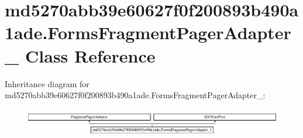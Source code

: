\hypertarget{classmd5270abb39e60627f0f200893b490a1ade_1_1FormsFragmentPagerAdapter__1}{}\section{md5270abb39e60627f0f200893b490a1ade.\+Forms\+Fragment\+Pager\+Adapter\+\_ Class Reference}
\label{classmd5270abb39e60627f0f200893b490a1ade_1_1FormsFragmentPagerAdapter__1}
Inheritance diagram for md5270abb39e60627f0f200893b490a1ade.\+Forms\+Fragment\+Pager\+Adapter\+\_\+:\begin{figure}[H]
\begin{center}
\leavevmode
\includegraphics[height=1.255605cm]{classmd5270abb39e60627f0f200893b490a1ade_1_1FormsFragmentPagerAdapter__1}
\end{center}
\end{figure}
